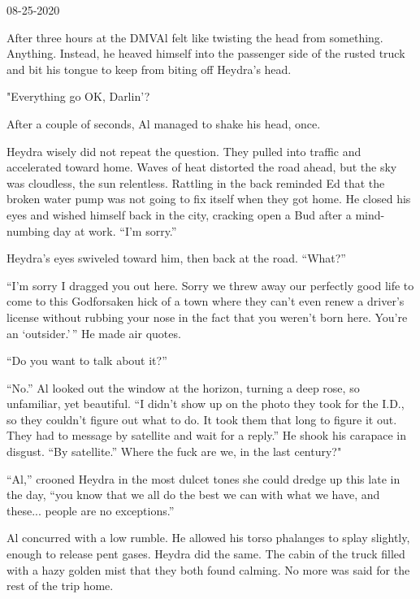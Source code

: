 08-25-2020

After three hours at the DMVAl felt like twisting the head from
something. Anything. Instead, he heaved himself into the passenger side
of the rusted truck and bit his tongue to keep from biting off Heydra's
head.

"Everything go OK, Darlin'?

After a couple of seconds, Al managed to shake his head, once.

Heydra wisely did not repeat the question. They pulled into traffic and
accelerated toward home. Waves of heat distorted the road ahead, but the
sky was cloudless, the sun relentless. Rattling in the back reminded Ed
that the broken water pump was not going to fix itself when they got
home. He closed his eyes and wished himself back in the city, cracking
open a Bud after a mind-numbing day at work. ``I'm sorry.''

Heydra's eyes swiveled toward him, then back at the road. ``What?''

``I'm sorry I dragged you out here. Sorry we threw away our perfectly
good life to come to this Godforsaken hick of a town where they can't
even renew a driver's license without rubbing your nose in the fact that
you weren't born here. You're an `outsider.'\,'' He made air quotes.

``Do you want to talk about it?''

``No.'' Al looked out the window at the horizon, turning a deep rose, so
unfamiliar, yet beautiful. ``I didn't show up on the photo they took for
the I.D., so they couldn't figure out what to do. It took them that long
to figure it out. They had to message by satellite and wait for a
reply.'' He shook his carapace in disgust. ``By satellite.'' Where the
fuck are we, in the last century?"

``Al,'' crooned Heydra in the most dulcet tones she could dredge up this
late in the day, ``you know that we all do the best we can with what we
have, and these... people are no exceptions.''

Al concurred with a low rumble. He allowed his torso phalanges to splay
slightly, enough to release pent gases. Heydra did the same. The cabin
of the truck filled with a hazy golden mist that they both found
calming. No more was said for the rest of the trip home.
